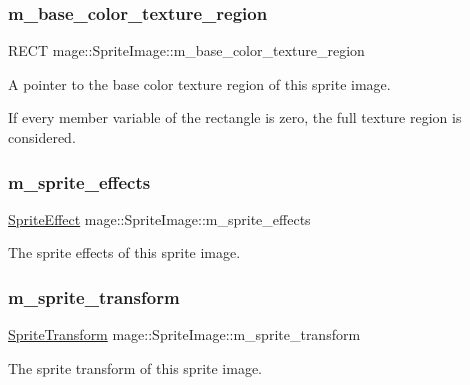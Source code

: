 \subsubsection{\texorpdfstring{m\+\_\+base\+\_\+color\+\_\+texture\+\_\+region}{m\_base\_color\_texture\_region}}
{\footnotesize\ttfamily R\+E\+CT mage\+::\+Sprite\+Image\+::m\+\_\+base\+\_\+color\+\_\+texture\+\_\+region\hspace{0.3cm}{\ttfamily [private]}}

A pointer to the base color texture region of this sprite image.

If every member variable of the rectangle is zero, the full texture region is considered. \hypertarget{classmage_1_1_sprite_image_acec094202967688a6e368eb44e5950ba}{}\label{classmage_1_1_sprite_image_acec094202967688a6e368eb44e5950ba} 
\subsubsection{\texorpdfstring{m\+\_\+sprite\+\_\+effects}{m\_sprite\_effects}}
{\footnotesize\ttfamily \hyperlink{namespacemage_a9cfe18123066ba4236f548f9de75d881}{Sprite\+Effect} mage\+::\+Sprite\+Image\+::m\+\_\+sprite\+\_\+effects\hspace{0.3cm}{\ttfamily [private]}}

The sprite effects of this sprite image. \hypertarget{classmage_1_1_sprite_image_aee2dc3f28e26692066fe791b71012929}{}\label{classmage_1_1_sprite_image_aee2dc3f28e26692066fe791b71012929} 
\subsubsection{\texorpdfstring{m\+\_\+sprite\+\_\+transform}{m\_sprite\_transform}}
{\footnotesize\ttfamily \hyperlink{classmage_1_1_sprite_transform}{Sprite\+Transform} mage\+::\+Sprite\+Image\+::m\+\_\+sprite\+\_\+transform\hspace{0.3cm}{\ttfamily [private]}}

The sprite transform of this sprite image. 